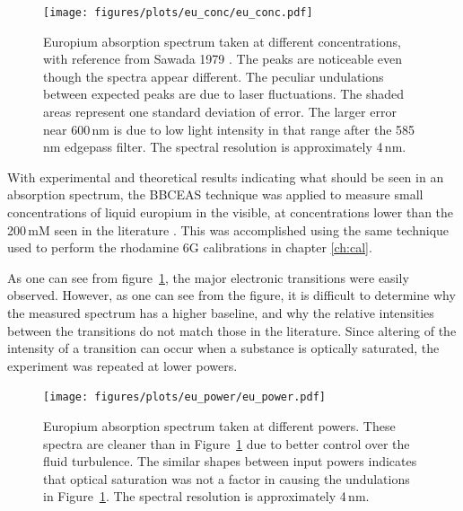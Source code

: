 \begin{figure}[t]
\begin{center}
\texttt{[image: figures/plots/eu\_conc/eu\_conc.pdf]}
\end{center}
\caption[Europium Absorption Spectra at different Concentrations]{Europium absorption spectrum taken at different concentrations, with reference from Sawada 1979 \cite{Sawada:1979vca}. The peaks are noticeable even though the spectra appear different. The peculiar undulations between expected peaks are due to laser fluctuations. The shaded areas represent one standard deviation of error. The larger error near 600\,nm is due to low light intensity in that range after the 585\,nm edgepass filter. The spectral resolution is approximately 4\,nm.}
\label{fig:eu_conc}
\end{figure}

With experimental and theoretical results indicating what should be seen in
an absorption spectrum, the \ac{BBCEAS} technique was applied to measure
small concentrations of liquid europium in the visible, at concentrations
lower than the 200\,mM seen in the literature \cite{Sawada:1979vca}. This
was accomplished using the same technique used to perform the rhodamine 6G
calibrations in chapter \ref{ch:cal}.

As one can see from figure~\ref{fig:eu_conc}, the major electronic transitions
were easily observed. However, as one can see from the figure, it is difficult
to determine why the measured spectrum has a higher baseline, and why the
relative intensities between the transitions do not match those in the
literature. Since altering of the intensity of a transition can occur when a
substance is optically saturated, the experiment was repeated at lower powers.

\begin{figure}[t]
\begin{center}
  \texttt{[image: figures/plots/eu\_power/eu\_power.pdf]}
\end{center}
\caption[Europium Absorption Spectra at different Input Intensities]{Europium absorption spectrum taken at different powers. These spectra are cleaner than in Figure~\ref{fig:eu_conc} due to better control over the fluid turbulence. The similar shapes between input powers indicates that optical saturation was not a factor in causing the undulations in Figure~\ref{fig:eu_conc}. The spectral resolution is approximately 4\,nm.}
\label{fig:eu_power}
\end{figure}

